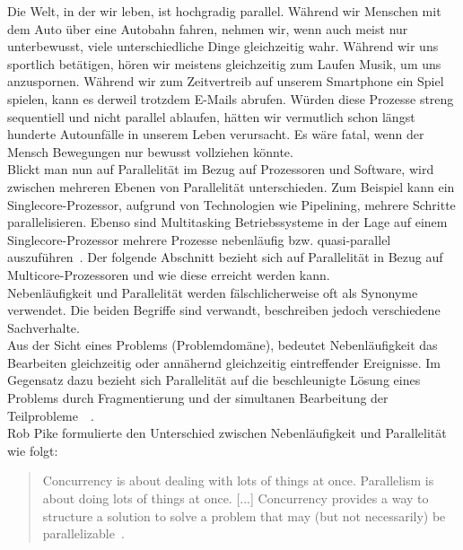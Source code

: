 Die Welt, in der wir leben, ist hochgradig parallel. Während wir Menschen mit dem Auto über eine Autobahn fahren, nehmen wir, wenn auch meist nur unterbewusst, viele unterschiedliche Dinge gleichzeitig wahr. Während wir uns sportlich betätigen, hören wir meistens gleichzeitig zum Laufen Musik, um uns anzuspornen. Während wir zum Zeitvertreib auf unserem Smartphone ein Spiel spielen, kann es derweil trotzdem E-Mails abrufen. Würden diese Prozesse streng sequentiell und nicht parallel ablaufen, hätten wir vermutlich schon längst hunderte Autounfälle in unserem Leben verursacht. Es wäre fatal, wenn der Mensch Bewegungen nur bewusst vollziehen könnte.\\
Blickt man nun auf Parallelität im Bezug auf Prozessoren und Software, wird zwischen mehreren Ebenen von Parallelität unterschieden. Zum Beispiel kann ein Singlecore-Prozessor, aufgrund von Technologien wie Pipelining, mehrere Schritte parallelisieren. Ebenso sind Multitasking Betriebssysteme in der Lage auf einem Singlecore-Prozessor mehrere Prozesse nebenläufig bzw. quasi-parallel auszuführen~\cite[S.~3~\&~S.~4]{butcher_seven_2014}. Der folgende Abschnitt bezieht sich auf Parallelität in Bezug auf Multicore-Prozessoren und wie diese erreicht werden kann.\\
Nebenläufigkeit und Parallelität werden fälschlicherweise oft als Synonyme verwendet. Die beiden Begriffe sind verwandt, beschreiben jedoch verschiedene Sachverhalte.\\
Aus der Sicht eines Problems (Problemdomäne), bedeutet Nebenläufigkeit das Bearbeiten gleichzeitig oder annähernd gleichzeitig eintreffender Ereignisse. Im Gegensatz dazu bezieht sich Parallelität auf die beschleunigte Lösung eines Problems durch Fragmentierung und der simultanen Bearbeitung der Teilprobleme~\cite[S.~1~\&~S.~2]{butcher_seven_2014}~\cite[S.~15]{vernon_reactive_2016}.\\
Rob Pike formulierte den Unterschied zwischen Nebenläufigkeit und Parallelität wie folgt:

\begin{quotation}
  Concurrency is about dealing with lots of things at once. Parallelism is about doing lots of things at once. [...] Concurrency provides a way to structure a solution to solve a problem that may (but not necessarily) be parallelizable~.
\cite[S.~10]{pike_concurrency_2012}
\end{quotation}

